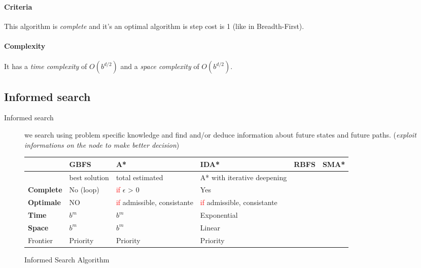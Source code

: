 \paragraph{Criteria}  This algorithm  is \textit{complete}  and it's  an
optimal algorithm is step cost is 1 (like in Breadth-First).

\paragraph{Complexity} It has a \textit{time complexity} of $O(b^{d/2})$
and a \textit{space complexity} of $O(b^{d/2})$.




\subsection{Informed search}

\begin{description}
    \item[Informed search] we search using problem specific knowledge and find and/or deduce information about future states and future paths. (\textit{exploit informations on the node
        to make better decision})
\end{description}


\begin{figure}[h]
    \centering
    \begin{tabular}{|l|m{2.5cm}|m{2.5cm}|m{2.5cm}|m{2.5cm}|m{2.5cm}|}
        \hline
        & \textbf{GBFS} & \textbf{A*} & \textbf{IDA*} & \textbf{RBFS} & \textbf{SMA*} \\
        \hline
        & best solution & total estimated & A* with iterative deepening & \\

        \hline
        \hline
        \textbf{Complete} & No (loop) & \textcolor{red}{if} $\epsilon$ > 0 & Yes  \\
        \hline
        \textbf{Optimale} & NO & \textcolor{red}{if} admissible, consistante & \textcolor{red}{if} admissible, consistante\\
        \hline
        \textbf{Time} & $b^m$ & $b^m$ & Exponential\\
        \hline
        \textbf{Space} &$b^m$ & $b^m$ & Linear\\
        \hline
        Frontier & Priority & Priority &Priority &\\
        \hline
    \end{tabular}
    \caption{Informed Search Algorithm}
\end{figure}


